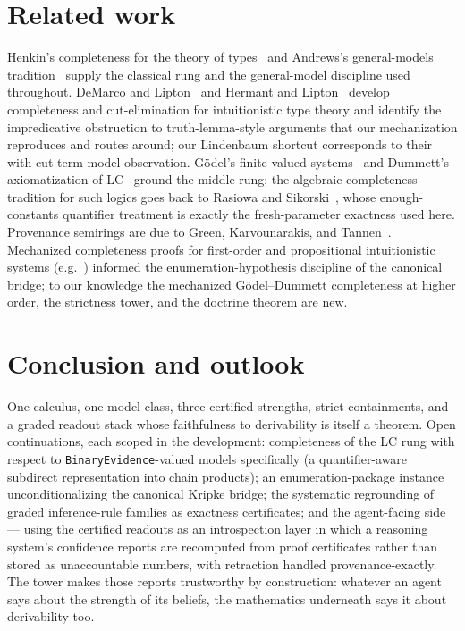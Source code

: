\documentclass[11pt]{article}
\newcommand{\code}[1]{\texttt{#1}}
\newcommand{\BE}{\code{BinaryEvidence}}
\theoremstyle{plain}
\theoremstyle{definition}
\begin{document}
\section{Related work}\label{sec:related}

Henkin's completeness for the theory of types~\cite{henkin} and Andrews's
general-models tradition~\cite{andrews} supply the classical rung and the
general-model discipline used throughout.  DeMarco and
Lipton~\cite{demarco-lipton} and Hermant and Lipton~\cite{hermant-lipton}
develop completeness and cut-elimination for intuitionistic type theory and
identify the impredicative obstruction to truth-lemma-style arguments that
our mechanization reproduces and routes around; our Lindenbaum shortcut
corresponds to their with-cut term-model observation.  G\"odel's
finite-valued systems~\cite{goedel32} and Dummett's axiomatization of
LC~\cite{dummett} ground the middle rung; the algebraic completeness
tradition for such logics goes back to Rasiowa and
Sikorski~\cite{rasiowa-sikorski}, whose enough-constants quantifier treatment
is exactly the fresh-parameter exactness used here.  Provenance semirings are
due to Green, Karvounarakis, and Tannen~\cite{provenance}.  Mechanized
completeness proofs for first-order and propositional intuitionistic systems
(e.g.~\cite{from,forster-kirst-wehr}) informed the enumeration-hypothesis
discipline of the canonical bridge; to our knowledge the mechanized
G\"odel--Dummett completeness at higher order, the strictness tower, and the
doctrine theorem are new.

\section{Conclusion and outlook}

One calculus, one model class, three certified strengths, strict
containments, and a graded readout stack whose faithfulness to derivability
is itself a theorem.  Open continuations, each scoped in the development:
completeness of the LC rung with respect to \BE{}-valued models specifically
(a quantifier-aware subdirect representation into chain products); an
enumeration-package instance unconditionalizing the canonical Kripke bridge;
the systematic regrounding of graded inference-rule families as exactness
certificates; and the agent-facing side --- using the certified readouts as
an introspection layer in which a reasoning system's confidence reports are
recomputed from proof certificates rather than stored as unaccountable
numbers, with retraction handled provenance-exactly.  The tower makes those
reports trustworthy by construction: whatever an agent says about the
strength of its beliefs, the mathematics underneath says it about
derivability too.
\end{document}
